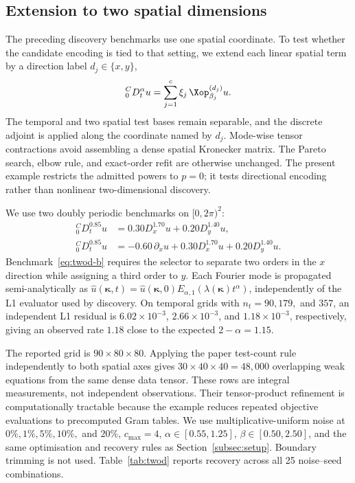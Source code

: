 
\subsection{Extension to two spatial dimensions}\label{subsec:twod}

The preceding discovery benchmarks use one spatial coordinate. To test whether the candidate encoding is tied to that setting, we extend each linear spatial term by a direction label $d_j\in\{x,y\}$,
\begin{equation}
{}^{C}_{0}D_t^\alpha u=\sum_{j=1}^{c}\xi_j\,\Xop_{\beta_j}^{(d_j)}u .
\label{eq:twod-model}
\end{equation}
The temporal and two spatial test bases remain separable, and the discrete adjoint is applied along the coordinate named by $d_j$. Mode-wise tensor contractions avoid assembling a dense spatial Kronecker matrix. The Pareto search, elbow rule, and exact-order refit are otherwise unchanged. The present example restricts the admitted powers to $p=0$; it tests directional encoding rather than nonlinear two-dimensional discovery.

We use two doubly periodic benchmarks on $[0,2\pi)^2$:
\begin{align}
{}^{C}_{0}D_t^{0.85}u
 &=0.30D_x^{1.70}u+0.20D_y^{1.40}u, \label{eq:twod-a}\\
{}^{C}_{0}D_t^{0.85}u
 &=-0.60\,\partial_xu+0.30D_x^{1.70}u+0.20D_y^{1.40}u. \label{eq:twod-b}
\end{align}
Benchmark~\eqref{eq:twod-b} requires the selector to separate two orders in the $x$ direction while assigning a third order to $y$. Each Fourier mode is propagated semi-analytically as $\widehat u(\bm\kappa,t)=\widehat u(\bm\kappa,0)E_{\alpha,1}(\lambda(\bm\kappa)t^\alpha)$, independently of the L1 evaluator used by discovery. On temporal grids with $n_t=90,179,$ and $357$, an independent L1 residual is $6.02\times10^{-3}$, $2.66\times10^{-3}$, and $1.18\times10^{-3}$, respectively, giving an observed rate $1.18$ close to the expected $2-\alpha=1.15$.

The reported grid is $90\times80\times80$. Applying the paper test-count rule independently to both spatial axes gives $30\times40\times40=48{,}000$ overlapping weak equations from the same dense data tensor. These rows are integral measurements, not independent observations. Their tensor-product refinement is computationally tractable because the example reduces repeated objective evaluations to precomputed Gram tables. We use multiplicative-uniform noise at $0\%,1\%,5\%,10\%,$ and $20\%$, $c_{\max}=4$, $\alpha\in[0.55,1.25]$, $\beta\in[0.50,2.50]$, and the same optimisation and recovery rules as Section~\ref{subsec:setup}. Boundary trimming is not used. Table~\ref{tab:twod} reports recovery across all 25 noise--seed combinations.

